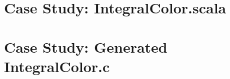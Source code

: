 \documentclass{article}
\begin{document}
\appendix



\clearpage
\section{Case Study: IntegralColor.scala}
\label{sec:case-study-input-code}





\clearpage
\section{Case Study: Generated IntegralColor.c}
\label{sec:case-study-output-code}


\end{document}
